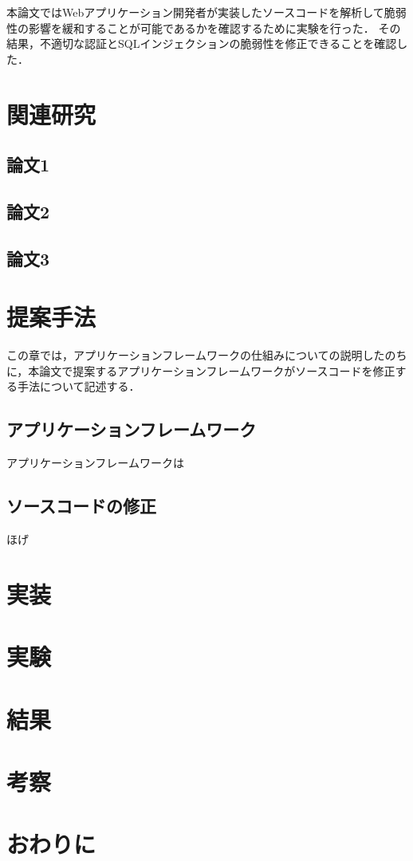 \documentclass[a4paper,12pt]{jreport}
\begin{document}
本論文ではWebアプリケーション開発者が実装したソースコードを解析して脆弱性の影響を緩和することが可能であるかを確認するために実験を行った．
その結果，不適切な認証とSQLインジェクションの脆弱性を修正できることを確認した．

\chapter{関連研究}
\section{論文1}
\section{論文2}
\section{論文3}

\chapter{提案手法}
この章では，アプリケーションフレームワークの仕組みについての説明したのちに，本論文で提案するアプリケーションフレームワークがソースコードを修正する手法について記述する．
\section{アプリケーションフレームワーク}
アプリケーションフレームワークは

\section{ソースコードの修正}
ほげ

\chapter{実装}

\chapter{実験}

\chapter{結果}

\chapter{考察}

\chapter{おわりに}
\end{document}
